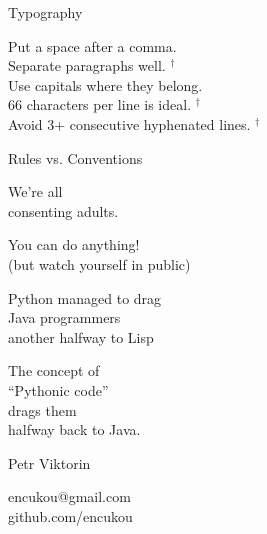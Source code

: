 \documentclass[20pt]{beamer}
\begin{document}
\begin{center}


\begin{frame}[fragile]
Typography

\bigskip
{\small

    Put a space after a comma.\\
    Separate paragraphs well. $^\dag$\\
    Use capitals where they belong.\\
    66 characters per line is ideal. $^\dag$\\
    Avoid 3+ consecutive hyphenated lines. $^\dag$\\
}

\end{frame}

\begin{frame}[fragile]
Rules vs. Conventions
\end{frame}

\begin{frame}[fragile]
We're all\\
consenting adults.

\bigskip
\bigskip

You can do anything!\\
\pause
{\small (but watch yourself in public)}
\end{frame}

\begin{frame}[fragile]
Python managed to drag\\
Java programmers\\
another halfway to Lisp

\pause
\bigskip

The concept of\\
“Pythonic code”\\
drags them\\
halfway back to Java.
\end{frame}

\begin{frame}[fragile]
\bigskip\bigskip\bigskip\bigskip\bigskip


\bigskip\bigskip\bigskip\bigskip
\small Petr Viktorin

{\tiny
encukou@gmail.com\\
github.com/encukou\\
}
\end{frame}


\end{center}
\end{document}
